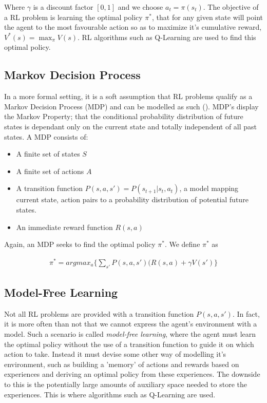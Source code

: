 Where $\gamma$ is a discount factor $[0, 1]$ and we choose $a_t = \pi(s_t)$. The objective of a RL
problem is learning the optimal policy $\pi^*$, that for any given state will point the agent to the
most favourable action so as to maximize it's cumulative reward, $V^*(s) = \max_{\pi}V(s)$. RL
algorithms such as Q-Learning are used to find this optimal policy. \paragraph{}

\subsection{Markov Decision Process}
In a more formal setting, it is a soft assumption that RL problems qualify as a Markov Decision
Process (MDP) and can be modelled as such (\cite{survey-drl}). MDP's display the Markov Property; that
the conditional probability distribution of future states is dependant only on the current state and
totally independent of all past states. A MDP consists of:

\begin{itemize}
    \item A finite set of states $S$
    \item A finite set of actions $A$
    \item A transition function $P(s, a, s') = P(s_{t+1}|s_t, a_t)$, a model mapping current state,
          action pairs to a probability distribution of potential future states.
    \item An immediate reward function $R(s, a)$
\end{itemize}

Again, an MDP seeks to find the optimal policy $\pi^*$. We define $\pi^*$ as

\begin{align}
    \pi^* = argmax_a\{\sum_{s'}P(s, a, s')(R(s, a) + \gamma V(s')\}
\end{align}

\subsection{Model-Free Learning}
Not all RL problems are provided with a transition function $P(s, a, s')$. In fact, it is more often
than not that we cannot express the agent's environment with a model. Such a scenario is called
\textit{model-free learning}, where the agent must learn the optimal policy without the use of a
transition function to guide it on which action to take. Instead it must devise some other way of
modelling it's environment, such as building a 'memory' of actions and rewards based on experiences
and deriving an optimal policy from these experiences. The downside to this is the potentially large
amounts of auxiliary space needed to store the experiences. This is where algorithms such as
Q-Learning are used. \paragraph{}

